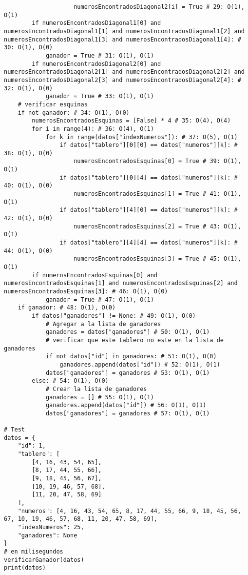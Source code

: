 \documentclass[10pt,twocolumn]{article}
\begin{document}
\begin{lstlisting}
					numerosEncontradosDiagonal2[i] = True # 29: O(1), O(1)
		if numerosEncontradosDiagonal1[0] and numerosEncontradosDiagonal1[1] and numerosEncontradosDiagonal1[2] and numerosEncontradosDiagonal1[3] and numerosEncontradosDiagonal1[4]: # 30: O(1), O(0)
			ganador = True # 31: O(1), O(1)
		if numerosEncontradosDiagonal2[0] and numerosEncontradosDiagonal2[1] and numerosEncontradosDiagonal2[2] and numerosEncontradosDiagonal2[3] and numerosEncontradosDiagonal2[4]: # 32: O(1), O(0)
			ganador = True # 33: O(1), O(1)
	# verificar esquinas
	if not ganador: # 34: O(1), O(0)
		numerosEncontradosEsquinas = [False] * 4 # 35: O(4), O(4)
		for i in range(4): # 36: O(4), O(1)
			for k in range(datos["indexNumeros"]): # 37: O(5), O(1)
				if datos["tablero"][0][0] == datos["numeros"][k]: # 38: O(1), O(0)
					numerosEncontradosEsquinas[0] = True # 39: O(1), O(1)
				if datos["tablero"][0][4] == datos["numeros"][k]: # 40: O(1), O(0)
					numerosEncontradosEsquinas[1] = True # 41: O(1), O(1)
				if datos["tablero"][4][0] == datos["numeros"][k]: # 42: O(1), O(0)
					numerosEncontradosEsquinas[2] = True # 43: O(1), O(1)
				if datos["tablero"][4][4] == datos["numeros"][k]: # 44: O(1), O(0)
					numerosEncontradosEsquinas[3] = True # 45: O(1), O(1)
		if numerosEncontradosEsquinas[0] and numerosEncontradosEsquinas[1] and numerosEncontradosEsquinas[2] and numerosEncontradosEsquinas[3]: # 46: O(1), O(0)
			ganador = True # 47: O(1), O(1)
	if ganador: # 48: O(1), O(0)
		if datos["ganadores"] != None: # 49: O(1), O(0)
			# Agregar a la lista de ganadores
			ganadores = datos["ganadores"] # 50: O(1), O(1)
			# verificar que este tablero no este en la lista de ganadores
			if not datos["id"] in ganadores: # 51: O(1), O(0)
				ganadores.append(datos["id"]) # 52: O(1), O(1)
			datos["ganadores"] = ganadores # 53: O(1), O(1)
		else: # 54: O(1), O(0)
			# Crear la lista de ganadores
			ganadores = [] # 55: O(1), O(1)
			ganadores.append(datos["id"]) # 56: O(1), O(1)
			datos["ganadores"] = ganadores # 57: O(1), O(1)

# Test
datos = { 
	"id": 1,
	"tablero": [
		[4, 16, 43, 54, 65],
		[8, 17, 44, 55, 66],
		[9, 18, 45, 56, 67],
		[10, 19, 46, 57, 68],
		[11, 20, 47, 58, 69]
	],
	"numeros": [4, 16, 43, 54, 65, 8, 17, 44, 55, 66, 9, 18, 45, 56, 67, 10, 19, 46, 57, 68, 11, 20, 47, 58, 69],
	"indexNumeros": 25,
	"ganadores": None
}
# en milisegundos
verificarGanador(datos)
print(datos)
\end{lstlisting}

\end{document}
